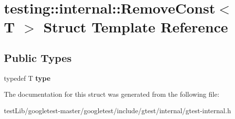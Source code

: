 \hypertarget{structtesting_1_1internal_1_1RemoveConst}{}\section{testing\+:\+:internal\+:\+:Remove\+Const$<$ T $>$ Struct Template Reference}
\label{structtesting_1_1internal_1_1RemoveConst}
\subsection*{Public Types}
\begin{DoxyCompactItemize}
\item 
\mbox{\label{structtesting_1_1internal_1_1RemoveConst_a1be32027ea4edcc0d15abd59aba4a97f}} 
typedef T {\bfseries type}
\end{DoxyCompactItemize}


The documentation for this struct was generated from the following file\+:\begin{DoxyCompactItemize}
\item 
test\+Lib/googletest-\/master/googletest/include/gtest/internal/gtest-\/internal.\+h\end{DoxyCompactItemize}
